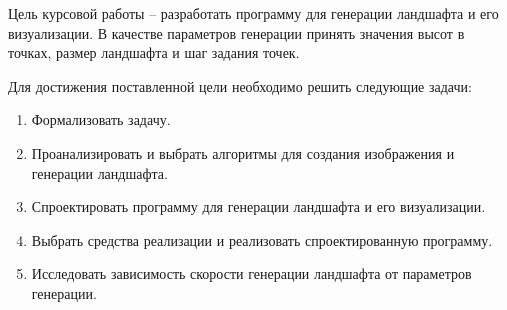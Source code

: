 
Цель курсовой работы -- разработать программу для генерации ландшафта и его визуализации. В качестве параметров генерации принять значения высот в точках, размер ландшафта и шаг задания точек. 

Для достижения поставленной цели необходимо решить следующие задачи:

\begin{enumerate}[label=\arabic*.]
	\item Формализовать задачу.
	\item Проанализировать и выбрать алгоритмы для создания изображения и генерации ландшафта.
	\item Спроектировать программу для генерации ландшафта и его визуализации.
	\item Выбрать средства реализации и реализовать спроектированную программу.
	\item Исследовать зависимость скорости генерации ландшафта от параметров генерации.
\end{enumerate}